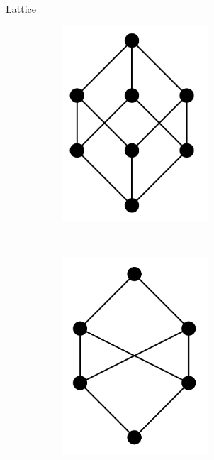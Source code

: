 \begin{frame}{Lattice}
  \begin{figure}
    \begin{subfigure}[b]{0.4\textwidth}
      \includegraphics[width=0.6\textwidth]{graphics/lattice}
    \end{subfigure}
    ~
    \begin{subfigure}[b]{0.4\textwidth}
      \includegraphics[width=0.6\textwidth]{graphics/notlattice}
    \end{subfigure}    
  \end{figure}
\end{frame}

